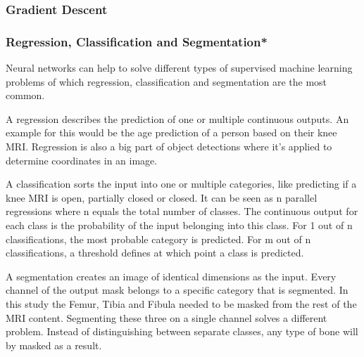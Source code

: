 \subsubsection{Gradient Descent} 

\subsubsection{Regression, Classification and Segmentation*}

Neural networks can help to solve different types of supervised machine learning problems of which regression, classification and segmentation are the most common.

A regression describes the prediction of one or multiple continuous outputs. An example for this would be the age prediction of a person based on their knee MRI. Regression is also a big part of object detections where it's applied to determine coordinates in an image.

A classification sorts the input into one or multiple categories, like predicting if a knee MRI is open, partially closed or closed. It can be seen as n parallel regressions where n equals the total number of classes. The continuous output for each class is the probability of the input belonging into this class. For 1 out of n classifications, the most probable category is predicted. For m out of n classifications, a threshold defines at which point a class is predicted.

A segmentation creates an image of identical dimensions as the input. Every channel of the output mask belongs to a specific category that is segmented. In this study the Femur, Tibia and Fibula needed to be masked from the rest of the MRI content. Segmenting these three on a single channel solves a different problem. Instead of distinguishing between separate classes, any type of bone will by masked as a result.

\newpage